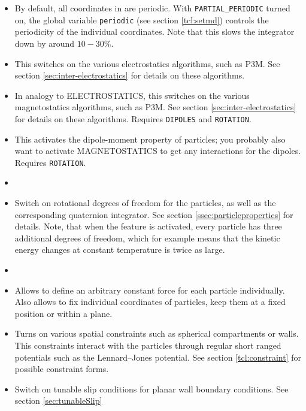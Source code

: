 \begin{itemize}
\item {} By default, all coordinates in \es{}
  are periodic. With \texttt{PARTIAL\_PERIODIC} turned on, the \es{}
  global variable \texttt{periodic} (see section \vref{tcl:setmd})
  controls the periodicity of the individual coordinates. Note that
  this slows the integrator down by around $10-30\%$.
\item {} This switches on the various
  electrostatics algorithms, such as P3M. See section
  \vref{sec:inter-electrostatics} for details on these algorithms.
\item {} In analogy to ELECTROSTATICS, this
  switches on the various magnetostatics algorithms, such as P3M.  See
  section \vref{sec:inter-electrostatics} for details on these
  algorithms.  Requires \texttt{DIPOLES} and \texttt{ROTATION}.
\item {} This activates the dipole-moment property of
  particles; you probably also want to activate MAGNETOSTATICS to get any
  interactions for the dipoles. Requires \texttt{ROTATION}.
\item {}
\item {} Switch on rotational degrees of freedom
  for the particles, as well as the corresponding quaternion
  integrator.  See section \vref{ssec:particleproperties} for
  details. Note, that when the feature is activated, every particle
  has three additional degrees of freedom, which for example means
  that the kinetic energy changes at constant temperature is twice as
  large.
\item {}
\item {} Allows to define an arbitrary
  constant force for each particle individually. Also allows to fix
  individual coordinates of particles, \eg keep them at a fixed
  position or within a plane.
\item {} Turns on various spatial constraints such
  as spherical compartments or walls. This constraints interact with
  the particles through regular short ranged potentials such as the
  Lennard--Jones potential. See section \vref{tcl:constraint} for
  possible constraint forms.
\item {} Switch on tunable slip conditions for
  planar wall boundary conditions. See section \vref{sec:tunableSlip}

\end{itemize}
